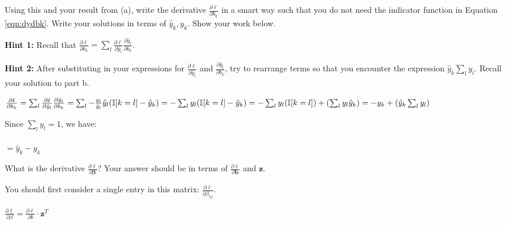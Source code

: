 \documentclass[11pt,addpoints,answers]{exam}
\newcommand{\bv}{\mathbf{b}}
\newcommand{\zv}{\mathbf{z}}
\newcommand{\betav      }{\boldsymbol \beta      }
\begin{document}
\begin{questions}
\begin{parts}
\begin{subparts}
    Using this and your result from (a), write the derivative $\frac{\partial \ell}{\partial b_k}$ in a smart way such that you do not need the indicator function in Equation \ref{eqn:dydbk}. Write your solutions in terms of $\hat{y}_k,y_k$. Show your work below.
    
    \textbf{Hint 1:} Recall that $\frac{\partial \ell}{\partial b_k} = \sum_l \frac{\partial \ell}{\partial \hat{y}_l}\frac{\partial \hat{y}_l}{\partial b_k}$.
    
    \textbf{Hint 2:} After substituting in your expressions for $\frac{\partial \ell}{\partial \hat{y}_l}$ and $\frac{\partial \hat{y}_l}{\partial b_k}$, try to rearrange terms so that you encounter the expression $\hat{y}_k \sum_l y_l$. Recall your solution to part b.
    
    \begin{your_solution}[title=$\partial \ell / \partial b_k$,height=11cm,width=15cm]
		$\frac{\partial \ell}{\partial b_k} = \sum_l \frac{\partial \ell}{\partial \hat{y}_l} \frac{\partial \hat{y}_l}{\partial b_k} \\
		\\		
		= \sum_l -\frac{y_l}{\hat{y}_l} \hat{y}_l (\mathbb{I}[k=l] - \hat{y}_k) \\
		\\
		= -\sum_l y_l (\mathbb{I}[k=l] - \hat{y}_k) \\
		\\
		= -\sum_l y_l (\mathbb{I}[k=l]) + (\sum_l y_l\hat{y}_k) \\		
		\\
		= -y_k + (\hat{y}_k\sum_l y_l)$
		\newline

		Since \(\sum_l y_l = 1\), we have:\\
		\\
		$= \hat{y}_k - y_k$
    \end{your_solution}
    
    \clearpage

    \subpart[2] What is the derivative $\frac{\partial \ell}{\partial \betav}$? Your answer should be in terms of $\frac{\partial \ell}{\partial \bv}$ and $\zv$. 
    
    You should first consider a single entry in this matrix: $\frac{\partial \ell}{\partial \beta_{kj}}$.
    
    \begin{your_solution}[title=$\partial \ell/\partial \betav$,height=6cm,width=15cm]
    $\frac{\partial \ell}{\partial \beta} = \frac{\partial \ell}{\partial b} \cdot \mathbf{z}^T$
    \end{your_solution}


\end{subparts}
\end{parts}
\end{questions}
\end{document}

